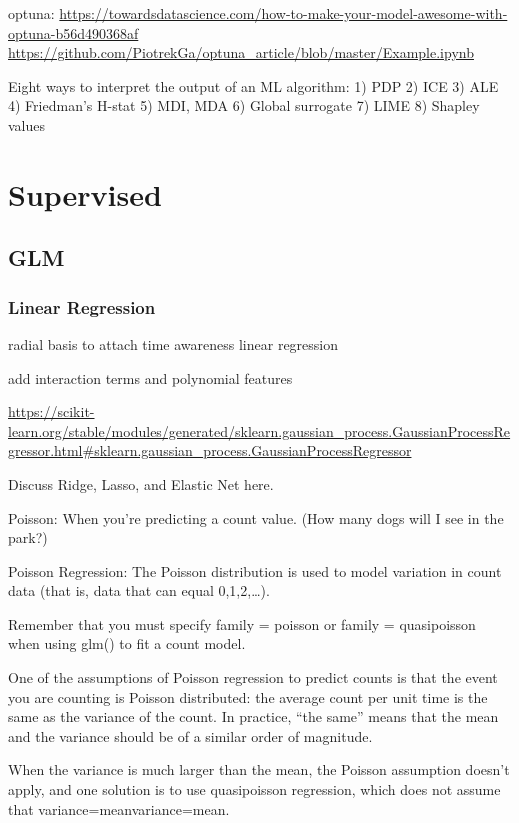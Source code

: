 \documentclass[]{book}
\begin{document}
optuna: \url{https://towardsdatascience.com/how-to-make-your-model-awesome-with-optuna-b56d490368af} \url{https://github.com/PiotrekGa/optuna_article/blob/master/Example.ipynb}

Eight ways to interpret the output of an ML algorithm: 1) PDP 2) ICE 3) ALE
4) Friedman's H-stat 5) MDI, MDA 6) Global surrogate 7) LIME 8) Shapley values

\hypertarget{supervised}{%
\section{Supervised}\label{supervised}}

\hypertarget{glm}{%
\subsection{GLM}\label{glm}}

\hypertarget{linear-regression}{%
\subsubsection{Linear Regression}\label{linear-regression}}

radial basis to attach time awareness linear regression

add interaction terms and polynomial features

\url{https://scikit-learn.org/stable/modules/generated/sklearn.gaussian_process.GaussianProcessRegressor.html\#sklearn.gaussian_process.GaussianProcessRegressor}

Discuss Ridge, Lasso, and Elastic Net here.

Poisson: When you're predicting a count value. (How many dogs will I see in the park?)

Poisson Regression: The Poisson distribution is used to model variation in count data (that is, data that can equal 0,1,2,\ldots{}).

Remember that you must specify family = poisson or family = quasipoisson when using glm() to fit a count model.

One of the assumptions of Poisson regression to predict counts is that the event you are counting is Poisson distributed: the average count per unit time is the same as the variance of the count. In practice, ``the same'' means that the mean and the variance should be of a similar order of magnitude.

When the variance is much larger than the mean, the Poisson assumption doesn't apply, and one solution is to use quasipoisson regression, which does not assume that variance=meanvariance=mean.
\end{document}
